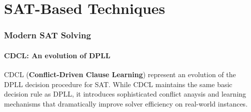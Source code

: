 \documentclass[a4paper]{article}
\theoremstyle{definition}
\begin{document}
\part{SAT-Based Techniques}
\section{Modern SAT Solving}
\subsection{CDCL: An evolution of DPLL}
CDCL (\textbf{Conflict-Driven Clause Learning}) represent an evolution of the DPLL decision procedure 
for SAT. While CDCL maintains the same basic decision rule as DPLL, it introduces sophisticated conflict anaysis and learning mechanisms that 
dramatically improve solver efficiency on real-world instances.
\end{document}
